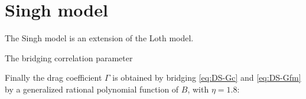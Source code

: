 \section{Singh model} \label{DS}
    The Singh model \citep{singh+2020} is an extension of the Loth model.

    The bridging correlation parameter

    Finally the drag coefficient $\Gamma$ is obtained by bridging \cref{eq:DS-Gc} and \cref{eq:DS-Gfm}
    by a generalized rational polynomial function of $B$, with $\eta = \num{1.8}$:
